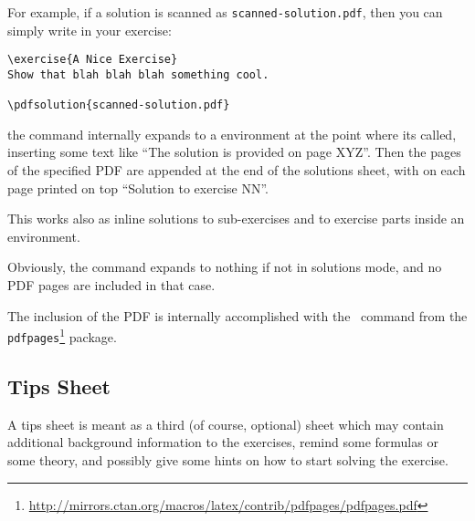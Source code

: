 \documentclass[11pt,a4paper]{article}
\begin{document}
For example, if a solution is scanned as \texttt{scanned-solution.pdf}, then you can
simply write in your exercise:
\begin{pkgverbatim}
\begin{verbatim}
\exercise{A Nice Exercise}
Show that blah blah blah something cool.

\pdfsolution{scanned-solution.pdf}

\end{verbatim}
\end{pkgverbatim}

the  command internally expands to a  environment
at the point where its called, inserting some text like ``The solution is provided on page
XYZ''. Then the pages of the specified PDF are appended at the end of the solutions sheet,
with on each page printed on top ``Solution to exercise NN''.

This works also as inline solutions to sub-exercises and to exercise parts inside an
 environment.

Obviously, the command expands to nothing if not in solutions mode, and no PDF pages are
included in that case.

The inclusion of the PDF is internally accomplished with the~ command
from the
\texttt{pdfpages}\footnote{\url{http://mirrors.ctan.org/macros/latex/contrib/pdfpages/pdfpages.pdf}}
package.




\subsection{Tips Sheet}
\label{sec:tips}

A tips sheet is meant as a third (of course, optional) sheet which may contain additional
background information to the exercises, remind some formulas or some theory, and possibly
give some hints on how to start solving the exercise.
\end{document}
